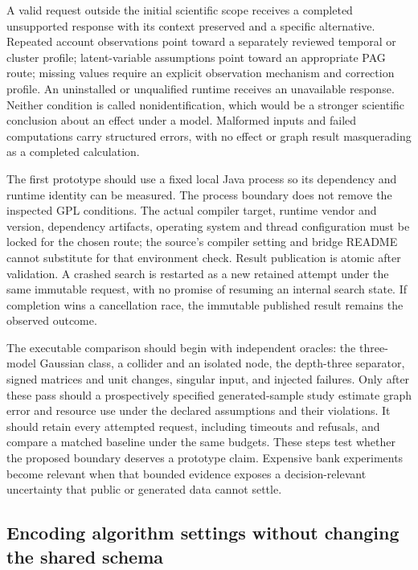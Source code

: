 A valid request outside the initial scientific scope receives a
completed unsupported response with its context preserved and a specific
alternative. Repeated account observations point toward a separately
reviewed temporal or cluster profile; latent-variable assumptions point
toward an appropriate PAG route; missing values require an explicit
observation mechanism and correction profile. An uninstalled or
unqualified runtime receives an unavailable response. Neither condition
is called nonidentification, which would be a stronger scientific
conclusion about an effect under a model. Malformed inputs and failed
computations carry structured errors, with no effect or graph result
masquerading as a completed calculation.
\citep{exec13_java_adapter_contract}

The first prototype should use a fixed local Java process so its
dependency and runtime identity can be measured. The process boundary
does not remove the inspected GPL conditions. The actual compiler
target, runtime vendor and version, dependency artifacts, operating
system and thread configuration must be locked for the chosen route; the
source's compiler setting and bridge README cannot substitute for that
environment check. Result publication is atomic after validation. A
crashed search is restarted as a new retained attempt under the same
immutable request, with no promise of resuming an internal search state.
If completion wins a cancellation race, the immutable published result
remains the observed outcome.
\citep{exec13_java_tetrad,exec13_java_adapter_contract}

The executable comparison should begin with independent oracles: the
three-model Gaussian class, a collider and an isolated node, the
depth-three separator, signed matrices and unit changes, singular input,
and injected failures. Only after these pass should a prospectively
specified generated-sample study estimate graph error and resource use
under the declared assumptions and their violations. It should retain
every attempted request, including timeouts and refusals, and compare a
matched baseline under the same budgets. These steps test whether the
proposed boundary deserves a prototype claim. Expensive bank experiments
become relevant when that bounded evidence exposes a decision-relevant
uncertainty that public or generated data cannot settle.
\label{exec13:java-adapter-end}

\hypertarget{encoding-algorithm-settings-without-changing-the-shared-schema}{%
\subsection{Encoding algorithm settings without changing the shared
schema}\label{encoding-algorithm-settings-without-changing-the-shared-schema}}


